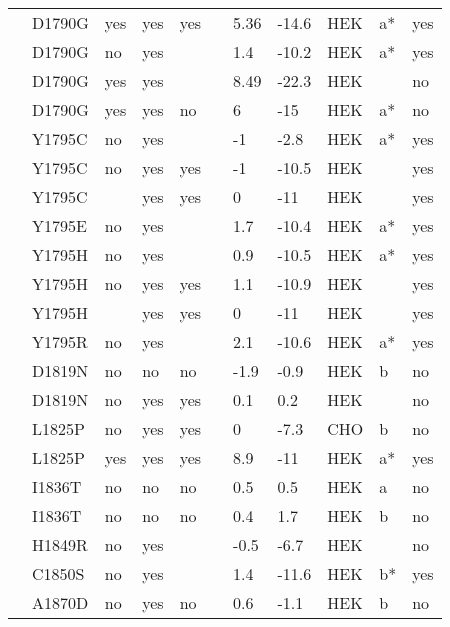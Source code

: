 \begin{tiny}
\begin{longtable}{p{4cm}|l|llll|ll|lll}
\citet{Baroudi2000bMutationDB} & D1790G & yes & yes & yes &  & 5.36 & -14.6 & HEK & a* & yes \\
\citet{Liu2002MutationDB} & D1790G & no & yes &  &  & 1.4 & -10.2 & HEK & a* & yes \\
\citet{Liu2003aMutationDB} & D1790G & yes & yes &  &  & 8.49 & -22.3 & HEK &  & no \\
\citet{Wehrens2000MutationDB} & D1790G & yes & yes & no &  & 6 & -15 & HEK & a* & no \\
\citet{Liu2002MutationDB} & Y1795C & no & yes &  &  & -1 & -2.8 & HEK & a* & yes \\
\citet{Rivolta2001MutationDB} & Y1795C & no & yes & yes &  & -1 & -10.5 & HEK &  & yes \\
\citet{Tateyama2003MutationDB} & Y1795C &  & yes & yes &  & 0 & -11 & HEK &  & yes \\
\citet{Liu2002MutationDB} & Y1795E & no & yes &  &  & 1.7 & -10.4 & HEK & a* & yes \\
\citet{Liu2002MutationDB} & Y1795H & no & yes &  &  & 0.9 & -10.5 & HEK & a* & yes \\
\citet{Rivolta2001MutationDB} & Y1795H & no & yes & yes &  & 1.1 & -10.9 & HEK &  & yes \\
\citet{Tateyama2003MutationDB} & Y1795H &  & yes & yes &  & 0 & -11 & HEK &  & yes \\
\citet{Liu2002MutationDB} & Y1795R & no & yes &  &  & 2.1 & -10.6 & HEK & a* & yes \\
\citet{Kapplinger2015MutationDB} & D1819N & no & no & no &  & -1.9 & -0.9 & HEK & b & no \\
\citet{Olesen2012MutationDB} & D1819N & no & yes & yes &  & 0.1 & 0.2 & HEK &  & no \\
\citet{Liu2005MutationDB} & L1825P & no & yes & yes &  & 0 & -7.3 & CHO & b & no \\
\citet{Makita2002MutationDB} & L1825P & yes & yes & yes &  & 8.9 & -11 & HEK & a* & yes \\
\citet{Cheng2010MutationDB} & I1836T & no & no & no &  & 0.5 & 0.5 & HEK & a & no \\
\citet{Cheng2010MutationDB} & I1836T & no & no & no &  & 0.4 & 1.7 & HEK & b & no \\
\citet{Musa2015MutationDB} & H1849R & no & yes &  &  & -0.5 & -6.7 & HEK &  & no \\
\citet{Petitprez2008MutationDB} & C1850S & no & yes &  &  & 1.4 & -11.6 & HEK & b* & yes \\
\citet{Beyder2014MutationDB} & A1870D & no & yes & no &  & 0.6 & -1.1 & HEK & b & no \\

\end{longtable}
\end{tiny}
